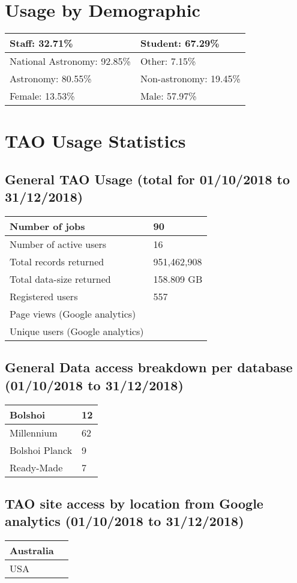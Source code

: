 \documentclass{article}%
\begin{document}
\section{Usage by Demographic}%

%
\begin{longtabu}{X[l] X[l]}%
Staff:  32.71\%&Student:  67.29\%\\%
\hline%
National Astronomy:  92.85\%&Other:  7.15\%\\%
\hline%
Astronomy:  80.55\%&Non{-}astronomy:  19.45\%\\%
\hline%
Female:  13.53\%&Male:  57.97\%\\%
\hline%
\end{longtabu}%
\newpage%
\section{TAO Usage Statistics}%

%
\subsection{General TAO Usage (total for 01/10/2018 to 31/12/2018)}%

%
\begin{longtabu}{X[l] X[l]}%
Number of jobs&90\\%
\hline%
Number of active users&16\\%
\hline%
Total records returned&951,462,908\\%
\hline%
Total data{-}size returned&158.809 GB\\%
\hline%
Registered users&557\\%
\hline%
Page views (Google analytics)&\\%
\hline%
Unique users (Google analytics)&\\%
\hline%
\end{longtabu}%
\subsection{General Data access breakdown per database (01/10/2018 to 31/12/2018)}%

%
\begin{longtabu}{X[l] X[l]}%
Bolshoi&12\\%
\hline%
Millennium&62\\%
\hline%
Bolshoi Planck&9\\%
\hline%
Ready{-}Made&7\\%
\hline%
\end{longtabu}%
\subsection{TAO site access by location from Google analytics (01/10/2018 to 31/12/2018)}%

%
\begin{longtabu}{X[l] X[l]}%
Australia&\\%
\hline%
USA&\\%
\hline%
\end{longtabu}%
\end{document}
